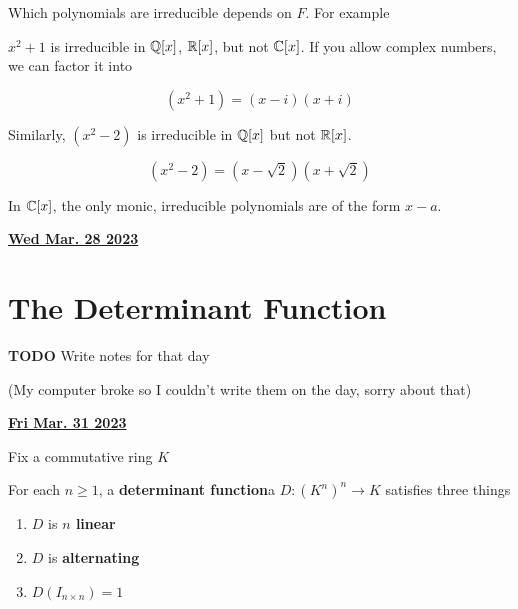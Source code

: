 \documentclass[12pt]{article}
\renewcommand{\date}[1]{\underline{\bf #1}}
\newcommand{\TODO}{\color{red}\textbf{TODO}\color{black}}
\begin{document}


  Which polynomials are irreducible depends on $F$. For example

  $x^2 + 1$ is irreducible in ${\mathbb Q}[x]$, ${\mathbb R}[x]$, but not ${\mathbb C}[x]$. If you allow
  complex numbers, we can factor it into

  \[
    (x^2 + 1) = (x - i)(x + i)
  \]

  Similarly, $(x^2 - 2)$ is irreducible in ${\mathbb Q}[x]$ but not ${\mathbb R}[x]$.

  \[
    (x^2 - 2) = (x - \sqrt{2})(x + \sqrt{2})
  \]

  In ${\mathbb C}[x]$, the only monic, irreducible polynomials are of the form $x - a$.


  \date {Wed Mar. 28 2023}

  \section{The Determinant Function}

  \TODO{} Write notes for that day

  (My computer broke so I couldn't write them on the day, sorry about that)

  \date {Fri Mar. 31 2023}


  Fix a commutative ring $K$

  For each $n \ge 1$, a {\bf determinant function}a $D: (K^n)^n \to K$ satisfies
  three things

  \begin{enumerate}
    \item $D$ is {\bf $n$ linear}
    \item $D$ is {\bf alternating}
    \item $D(I_{n \times n}) = 1$
  \end{enumerate}
\end{document}
